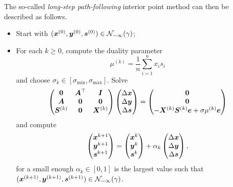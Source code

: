 The so-called {\em long-step path-following} interior point method can then be described as follows.
\begin{itemize}
 \item Start with $(\bm{x}^{(0)},\bm{y}^{(0)},\bm{s}^{(0)})\in \mathcal{N}_{-\infty}(\gamma)$;
 \item For each $k\geq 0$, compute the duality parameter
 \begin{equation*}
  \mu^{(k)} = \frac{1}{n} \sum_{i=1}^n x_is_i
 \end{equation*}
and choose $\sigma_k\in [\sigma_{\mathrm{min}},\sigma_{\mathrm{max}}]$. Solve
\begin{equation*}
 \begin{pmatrix}
  \bm{0} & \bm{A}^{\top} & \bm{I} \\
  \bm{A} & \bm{0} & \bm{0} \\
  \bm{S}^{(k)} & \bm{0} & \bm{X}^{(k)}
 \end{pmatrix}
\begin{pmatrix} \Delta\bm{x}\\ \Delta \bm{y}\\ \Delta\bm{s} \end{pmatrix} = \begin{pmatrix} \bm{0} \\ \bm{0} \\ -\bm{X}^{(k)}\bm{S}^{(k)}\bm{e}+\sigma \mu^{(k)}\bm{e}\end{pmatrix}
\end{equation*}
and compute
\begin{equation*}
\begin{pmatrix} \bm{x}^{k+1}\\ \bm{y}^{k+1}\\ \bm{s}^{k+1}\end{pmatrix}= \begin{pmatrix} \bm{x}^{k}\\ \bm{y}^{k}\\ \bm{s}^{k}\end{pmatrix} +\alpha_k \begin{pmatrix} \Delta\bm{x}\\ \Delta \bm{y}\\ \Delta\bm{s} \end{pmatrix},
 \end{equation*}
for a small enough $\alpha_k\in [0,1]$ is the largest value such that $(\bm{x}^{(k+1)},\bm{y}^{(k+1)},\bm{s}^{(k+1)})\in \mathcal{N}_{-\infty}(\gamma)$.
\end{itemize}

